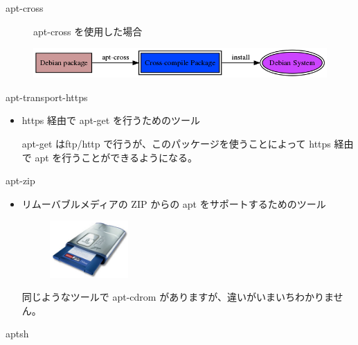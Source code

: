 \documentclass[cjk,dvipdfmx,12pt]{beamer}
\newenvironment{commandline}%
{\VerbatimEnvironment
  \begin{Sbox}\begin{minipage}{0.9\hsize}\begin{fontsize}{7.3}{7.3} \begin{BVerbatim}}%
{\end{BVerbatim}\end{fontsize}\end{minipage}\end{Sbox}
  \setlength{\fboxsep}{8pt}

\vspace{6pt}%
\fcolorbox{dancerdarkblue}{dancerlightblue}{\TheSbox}

\vspace{6pt}%
}
\begin{document}
\begin{frame}{apt-cross}
 \begin{figure}[h]
apt-cross を使用した場合
 \begin{center}
 \includegraphics[width=12cm]{image200709/apt-cross-e.png}
 \end{center}
 \end{figure}

\end{frame}


\begin{frame}{apt-transport-https}
 \begin{itemize}%
 \item https 経由で apt-get を行うためのツール

 apt-get はftp/http で行うが、このパッケージを使うことによって
 https 経由で apt を行うことができるようになる。
 \end{itemize}
\end{frame}

\begin{frame}{apt-zip}
 \begin{itemize}%
 \item リムーバブルメディアの ZIP からの apt をサポートするためのツール
 \begin{figure}[h]
 \begin{center}
 \includegraphics[width=3cm]{image200709/zip_750usb.jpg}
 \end{center}
 \end{figure}

 同じようなツールで apt-cdrom がありますが、違いがいまいちわかりません。
 \end{itemize}
\end{frame}

\begin{frame}[containsverbatim]{aptsh}
\end{frame}
\end{document}
